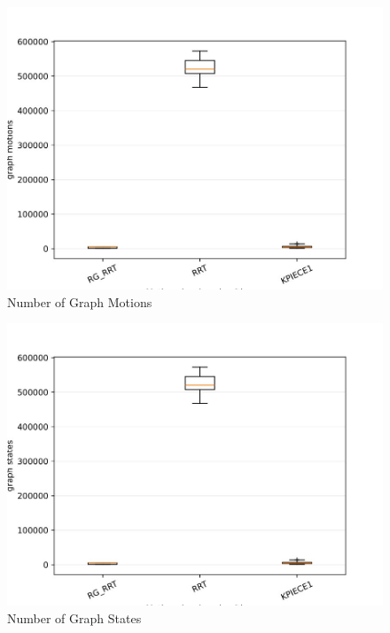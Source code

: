 \documentclass[conference]{IEEEtran}
\begin{document}
\begin{figure}[htp]
\centering
\includegraphics[scale=0.5]{combatBenchmarking/2.jpg}
\caption{Number of Graph Motions}
\label{Number of Graph Motions}
\end{figure}

\begin{figure}[htp]
\centering
\includegraphics[scale=0.5]{combatBenchmarking/3.jpg}
\caption{Number of Graph States}
\label{Number of Graph States}
\end{figure}
\end{document}
